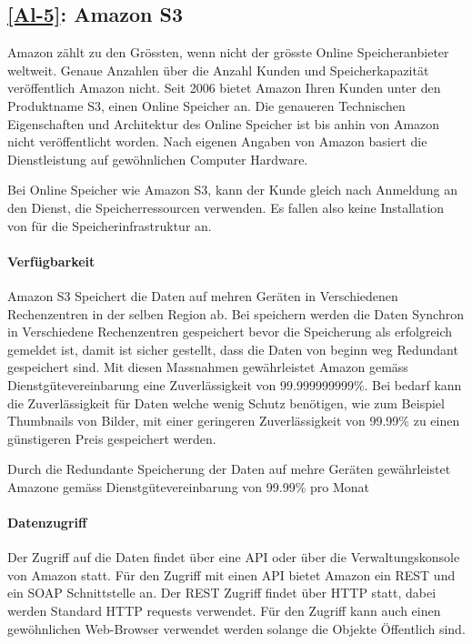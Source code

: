 \subsection{\ref{Al-5}: Amazon S3}
Amazon zählt zu den Grössten, wenn nicht der grösste Online Speicheranbieter weltweit. Genaue Anzahlen über die Anzahl Kunden und Speicherkapazität veröffentlich Amazon nicht. Seit 2006 bietet Amazon Ihren Kunden unter den Produktname S3, einen Online Speicher an. Die genaueren Technischen Eigenschaften und Architektur des Online Speicher ist bis anhin von Amazon nicht veröffentlicht worden. Nach eigenen Angaben von Amazon basiert die Dienstleistung auf gewöhnlichen Computer Hardware.






Bei Online Speicher wie Amazon S3, kann der Kunde gleich nach Anmeldung an den Dienst, die Speicherressourcen verwenden. Es fallen also keine Installation von für
die Speicherinfrastruktur an. 

\paragraph*{Verfügbarkeit}
Amazon S3 Speichert die Daten auf mehren Geräten in Verschiedenen Rechenzentren in der selben Region ab. Bei speichern werden die Daten Synchron in Verschiedene Rechenzentren gespeichert bevor die Speicherung als erfolgreich gemeldet ist, damit ist sicher gestellt, dass die Daten von beginn weg Redundant gespeichert sind. Mit diesen Massnahmen gewährleistet Amazon gemäss Dienstgütevereinbarung eine Zuverlässigkeit von 99.999999999\%. Bei bedarf kann die Zuverlässigkeit für Daten welche wenig Schutz benötigen, wie zum Beispiel Thumbnails von Bilder, mit einer geringeren Zuverlässigkeit von 99.99\% zu einen günstigeren Preis gespeichert werden. \cite{Amazon2007}

Durch die Redundante Speicherung der Daten auf mehre Geräten gewährleistet Amazone gemäss Dienstgütevereinbarung von 99.99\% pro Monat

\paragraph*{Datenzugriff}
Der Zugriff auf die Daten findet über eine API oder über die Verwaltungskonsole von Amazon statt. Für den Zugriff mit einen API bietet Amazon ein \gls{REST} und ein \gls{SOAP} Schnittstelle an. Der \gls{REST} Zugriff findet über HTTP statt, dabei werden Standard HTTP requests verwendet. Für den Zugriff kann auch einen gewöhnlichen Web-Browser verwendet werden solange die Objekte Öffentlich sind.

